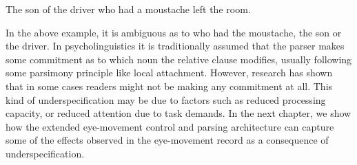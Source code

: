 \documentclass{cambridge7A}\usepackage[]{graphicx}\usepackage[]{color}
\begin{document}
\begin{exe}
\ex
The son of the driver who had a moustache left the room.
\end{exe}

In the above example, it is ambiguous as to who had the moustache, the son or the driver. In psycholinguistics it is traditionally assumed that the parser makes some commitment as to which noun the relative clause modifies, usually following some parsimony principle like local attachment. However, research has shown that in some cases readers might not be making any commitment at all. This kind of underspecification may be due to factors such as reduced processing capacity, or reduced attention due to  task demands. In the next chapter, we show how the extended eye-movement control and parsing architecture can capture some of the effects observed in the eye-movement record as a consequence of underspecification.
\end{document}
